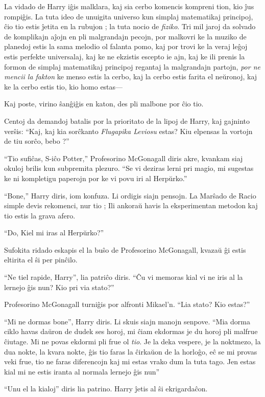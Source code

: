 La vidado de Harry iĝis malklara, kaj sia cerbo komencis kompreni
tion, kio ĵus rompiĝis. La tuta ideo de unuigita universo kun
simplaj matematikaj principoj, ĉio tio estis ĵetita en la
rubujon ; la tuta nocio de \emph{fiziko}. Tri mil jaroj da solvado de
komplikajn aĵojn en pli malgrandajn pecojn, por malkovri ke la muziko
de planedoj estis la sama melodio ol falanta pomo, kaj por trovi ke la
veraj leĝoj estis perfekte universalaj, kaj ke ne ekzistis escepto ie
ajn, kaj ke ili prenis la formon de simplaj matematikaj principoj
regantaj la malgrandajn partojn, \emph{por ne mencii la fakton} ke
menso estis la cerbo, kaj la cerbo estis farita el neŭronoj, kaj ke la
cerbo estis tio, kio homo estas—

Kaj poste, virino ŝanĝiĝis en katon, des pli malbone por ĉio tio.

Centoj da demandoj batalis por la prioritato de la lipoj de Harry, kaj
gajninto verŝis: ``Kaj, kaj kia sorĉkanto \emph{Flugapika Leviosu}
estas? Kiu elpensas la vortojn de tiu sorĉo, bebo ?''

``Tio sufiĉas, S-iĉo Potter,'' Profesorino McGonagall diris akre, kvankam
siaj okuloj brilis kun subpremita plezuro. ``Se vi deziras lerni pri
magio, mi sugestas ke ni kompletigu paperojn por ke vi povu iri al
Herpŭrko.''

``Bone,'' Harry diris, iom konfuza. Li ordigis siajn pensojn. La
Marŝado de Racio simple devis rekomenci, nur tio ; Ili ankoraŭ havis
la eksperimentan metodon kaj tio estis la grava afero.

``Do, Kiel mi iras al Herpŭrko?''

Sufokita ridado eskapis el la buŝo de Profesorino McGonagall, kvazaŭ ĝi estis
eltirita el ŝi per pinĉilo.

``Ne tiel rapide, Harry'', lia patriĉo diris. ``Ĉu vi memoras kial vi ne
iris al la lernejo ĝis nun? Kio pri via stato?''

Profesorino McGonagall turniĝis por alfronti Mikael'n. ``Lia stato? Kio estas?''

``Mi ne dormas bone'', Harry diris. Li skuis siajn manojn
senpove. ``Mia dorma ciklo havas daŭron de dudek ses horoj, mi ĉiam
ekdormas je du horoj pli malfrue ĉiutage. Mi ne povas ekdormi pli frue
ol \emph{tio}. Je la deka vespere, je la noktmezo, la dua nokte, la
kvara nokte, ĝis tio faras la ĉirkaŭon de la horloĝo, eĉ se mi provas
veki frue, tio ne faras diferencojn kaj mi estas vrako dum la tuta
tago. Jen estas kial mi ne estis iranta al normala lernejo ĝis nun''

``Unu el la kialoj'' diris lia patrino. Harry ĵetis al ŝi ekrigardaĉon.

